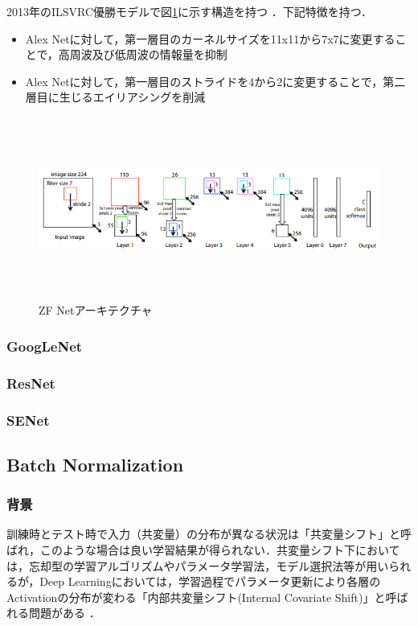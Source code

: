\documentclass[11pt,a4paper]{jsarticle}
\begin{document}
2013年のILSVRC優勝モデルで図\ref{arch_zfnet}に示す構造を持つ \cite{arxiv_zfnet}．下記特徴を持つ．

\begin{itemize}
	\item Alex Netに対して，第一層目のカーネルサイズを11x11から7x7に変更することで，高周波及び低周波の情報量を抑制
	\item Alex Netに対して，第一層目のストライドを4から2に変更することで，第二層目に生じるエイリアシングを削減
\end{itemize}

\begin{figure} [H]
	\begin{center}
		\includegraphics[clip, height=6cm, bb=-20 0 675 219]{data/figure/arch_zfnet.png}
		\caption{ZF Netアーキテクチャ}
		\label{arch_zfnet}
	\end{center}
\end{figure}



\subsubsection{GoogLeNet}

\subsubsection{ResNet}

\subsubsection{SENet}

\subsection{Batch Normalization}

\subsubsection{背景}
訓練時とテスト時で入力（共変量）の分布が異なる状況は「共変量シフト」と呼ばれ，このような場合は良い学習結果が得られない．共変量シフト下においては，忘却型の学習アルゴリズムやパラメータ学習法，モデル選択法等が用いられる\cite{cov_shift}が，Deep Learningにおいては，学習過程でパラメータ更新により各層のActivationの分布が変わる「内部共変量シフト(Internal Covariate Shift)」と呼ばれる問題がある\cite{bn_abs} \cite{bn_google}．
\end{document}
